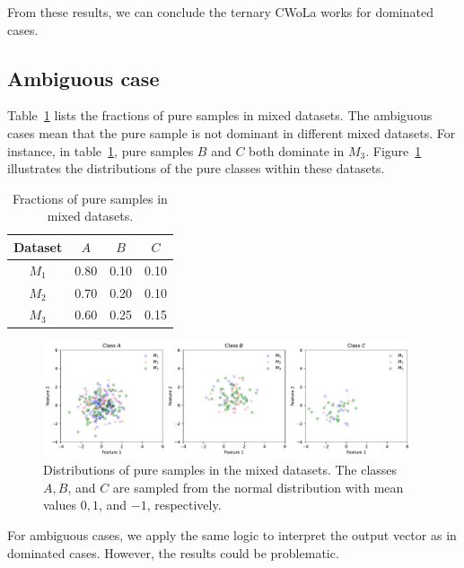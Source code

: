 \documentclass[12pt]{article}
\begin{document}
        From these results, we can conclude the ternary CWoLa works for dominated cases.
    \subsection{Ambiguous case}%
    \label{sub:ambiguous_case}
        Table~\ref{tab:type_fraction_ambiguous} lists the fractions of pure samples in mixed datasets. The ambiguous cases mean that the pure sample is not dominant in different mixed datasets. For instance, in table~\ref{tab:type_fraction_ambiguous}, pure samples $B$ and $C$ both dominate in $M_3$. Figure~\ref{fig:pure_sample_distribution_ambiguous} illustrates the distributions of the pure classes within these datasets.
        \begin{table}[htpb]
            \centering
            \caption{Fractions of pure samples in mixed datasets.}
            \label{tab:type_fraction_ambiguous}
            \begin{tabular}{c|ccc}
                Dataset & $A$  & $B$  & $C$  \\ \hline
                $M_1$   & 0.80 & 0.10 & 0.10 \\
                $M_2$   & 0.70 & 0.20 & 0.10 \\
                $M_3$   & 0.60 & 0.25 & 0.15
            \end{tabular}
        \end{table}
        \begin{figure}[htpb]
            \centering
            \includegraphics[width=0.97\textwidth]{multi-class_training_data-ambiguous.pdf}
            \caption{Distributions of pure samples in the mixed datasets. The classes $A, B$, and $C$ are sampled from the normal distribution with mean values $0, 1$, and $-1$, respectively.}
            \label{fig:pure_sample_distribution_ambiguous}
        \end{figure}

        For ambiguous cases, we apply the same logic to interpret the output vector as in dominated cases. However, the results could be problematic.
\end{document}
